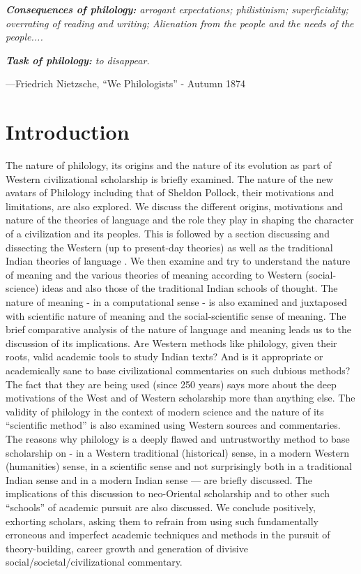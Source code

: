 \textit{\textbf{Consequences of philology:} arrogant expectations; philistinism; superficiality; overrating of reading and writing; Alienation from the people and the needs of the people.... }

\textit{\textbf{Task of philology:} to disappear.}

—Friedrich Nietzsche, “We Philologists” - Autumn 1874


\section*{Introduction}

The nature of philology, its origins and the nature of its evolution as part of Western civilizational scholarship is briefly examined. The nature of the new avatars of Philology including that of Sheldon Pollock, their motivations and limitations, are also explored. We discuss the different origins, motivations and nature of the theories of language and the role they play in shaping the character of a civilization and its peoples. This is followed by a section discussing and dissecting the Western (up to present-day theories) as well as the traditional Indian theories of language . We then examine and try to understand the nature of meaning and the various theories of meaning  according to Western (social-science) ideas and also those of the traditional Indian schools of thought. The nature of meaning - in a computational sense - is also examined and juxtaposed with scientific nature of meaning and the social-scientific sense of meaning. The brief comparative analysis of the nature of language and meaning leads us to the discussion of its implications. Are Western methods like philology, given their roots, valid academic tools to study Indian texts? And is it appropriate or academically sane to base civilizational commentaries on such dubious methods? The fact that they are being used (since 250 years) says more about the deep motivations of the West and of Western scholarship more than anything else. The validity of philology in the context of modern science and the nature of its “scientific method” is also examined using Western sources and commentaries. The reasons why philology is a deeply flawed and untrustworthy method to base scholarship on - in a Western traditional (historical) sense, in a modern Western (humanities) sense, in a scientific sense and not surprisingly both in a traditional Indian sense and in a modern Indian sense — are briefly discussed. The implications of this discussion to neo-Oriental scholarship and to other such “schools” of academic pursuit are also discussed. We conclude positively, exhorting scholars, asking them to refrain from using such fundamentally erroneous and imperfect academic techniques and methods in the pursuit of theory-building, career growth and generation of divisive social/societal/civilizational commentary.


